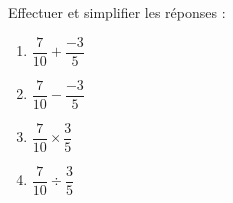 
\begin{exercice}\label{exo2smath-0097}

    Effectuer et simplifier les réponses :
    \begin{multicols}{4}
        \begin{enumerate}
            \item
                \( \dfrac{ 7 }{ 10 }+\dfrac{ -3 }{ 5 }\) 
            \item
                \( \dfrac{ 7 }{ 10 }-\dfrac{ -3 }{ 5 }\) 
            \item
                \( \dfrac{ 7 }{ 10 }\times\dfrac{ 3 }{ 5 }\) 
            \item
                \( \dfrac{ 7 }{ 10 }\div\dfrac{ 3 }{ 5 }\) 
        \end{enumerate}
    \end{multicols}

\end{exercice}
